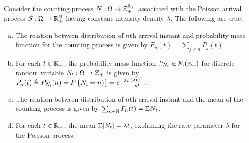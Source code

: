 \documentclass[letterpaper,10pt,english]{article}
\begin{document}
\begin{cor} 
Consider the counting process $N:\Omega\to\mathbb{Z}_+^{\mathbb{R}_+}$ associated with the Poisson arrival process $\tilde{S}:\Omega\to\mathbb{R}_+^{\mathbb{N}}$ having constant intensity density $\lambda$. 
The following are true.
\begin{enumerate}[(a)]
\item The relation between distribution of $n$th arrival instant and probability mass function for the counting process is given by  $F_n(t)= \sum_{j \ge n}P_j(t)$. 
\item For each $t\in\mathbb{R}_+$, the probability mass function $P_{N_t}\in\mathcal{M}(\mathbb{Z}_+)$ for discrete random variable $N_t:\Omega\to\mathbb{Z}_+$ is given by $P_n(t) \triangleq P_{N_t}(n) = P\left\{N_t=n)\right\}= e^{-\lambda t}\frac{(\lambda t)^{n}}{n!}$. 
\item  The relation between distribution of $n$th arrival instant and the mean of the counting process is given by $\sum_{n \in \mathbb{N}}F_n(t) = \mathbb{E} N_t$. 
\item For each $t\in\mathbb{R}_+$, the mean  $\mathbb{E}[N_t] = \lambda t$, explaining the rate parameter $\lambda$ for the Poisson process. 
\end{enumerate}
\end{cor}
\end{document}
